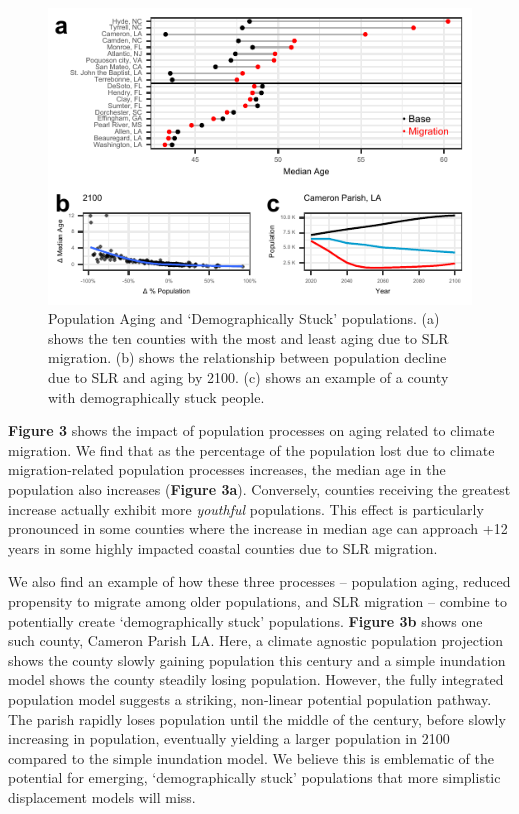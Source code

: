\documentclass[9pt,twocolumn,twoside,]{pnas-new}
\begin{document}
\begin{figure}
\centering
\includegraphics{FigAging.pdf}
\caption{Population Aging and `Demographically Stuck' populations. (a)
shows the ten counties with the most and least aging due to SLR
migration. (b) shows the relationship between population decline due to
SLR and aging by 2100. (c) shows an example of a county with
demographically stuck people.}
\end{figure}

\textbf{Figure 3} shows the impact of population processes on aging
related to climate migration. We find that as the percentage of the
population lost due to climate migration-related population processes
increases, the median age in the population also increases
(\textbf{Figure 3a}). Conversely, counties receiving the greatest
increase actually exhibit more \emph{youthful} populations. This effect
is particularly pronounced in some counties where the increase in median
age can approach +12 years in some highly impacted coastal counties due
to SLR migration.

We also find an example of how these three processes -- population
aging, reduced propensity to migrate among older populations, and SLR
migration -- combine to potentially create `demographically stuck'
populations. \textbf{Figure 3b} shows one such county, Cameron Parish
LA. Here, a climate agnostic population projection shows the county
slowly gaining population this century and a simple inundation model
shows the county steadily losing population. However, the fully
integrated population model suggests a striking, non-linear potential
population pathway. The parish rapidly loses population until the middle
of the century, before slowly increasing in population, eventually
yielding a larger population in 2100 compared to the simple inundation
model. We believe this is emblematic of the potential for emerging,
`demographically stuck' populations that more simplistic displacement
models will miss.
\end{document}
